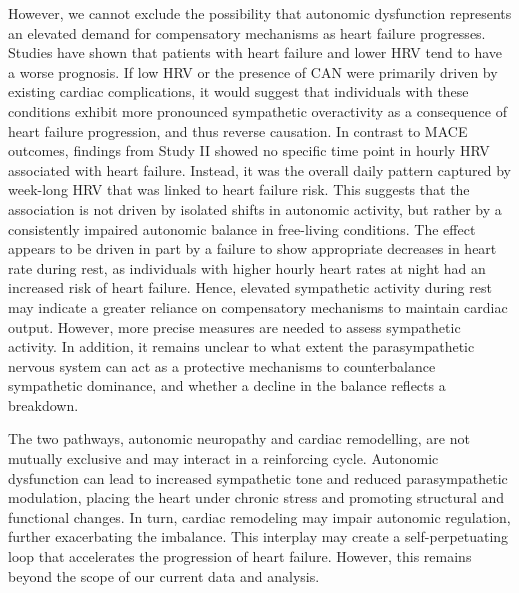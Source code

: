 \documentclass[
  a4paper,
  headsepline=true,
  open=any]{scrbook}
\begin{document}
However, we cannot exclude the possibility that autonomic dysfunction
represents an elevated demand for compensatory mechanisms as heart
failure progresses. Studies have shown that patients with heart failure
and lower HRV tend to have a worse prognosis. If low HRV or the presence
of CAN were primarily driven by existing cardiac complications, it would
suggest that individuals with these conditions exhibit more pronounced
sympathetic overactivity as a consequence of heart failure progression,
and thus reverse causation. In contrast to MACE outcomes, findings from
Study II showed no specific time point in hourly HRV associated with
heart failure. Instead, it was the overall daily pattern captured by
week-long HRV that was linked to heart failure risk. This suggests that
the association is not driven by isolated shifts in autonomic activity,
but rather by a consistently impaired autonomic balance in free-living
conditions. The effect appears to be driven in part by a failure to show
appropriate decreases in heart rate during rest, as individuals with
higher hourly heart rates at night had an increased risk of heart
failure. Hence, elevated sympathetic activity during rest may indicate a
greater reliance on compensatory mechanisms to maintain cardiac output.
However, more precise measures are needed to assess sympathetic
activity. In addition, it remains unclear to what extent the
parasympathetic nervous system can act as a protective mechanisms to
counterbalance sympathetic dominance, and whether a decline in the
balance reflects a breakdown.

The two pathways, autonomic neuropathy and cardiac remodelling, are not
mutually exclusive and may interact in a reinforcing cycle. Autonomic
dysfunction can lead to increased sympathetic tone and reduced
parasympathetic modulation, placing the heart under chronic stress and
promoting structural and functional changes. In turn, cardiac remodeling
may impair autonomic regulation, further exacerbating the imbalance.
This interplay may create a self-perpetuating loop that accelerates the
progression of heart failure. However, this remains beyond the scope of
our current data and analysis.
\end{document}

